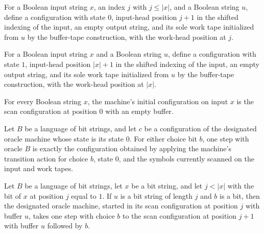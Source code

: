 \begin{definition}
\label{Complexity.uwScanCfg}
\leanok
{}
For a Boolean input string $x$, an index $j$ with $j\le |x|$, and a Boolean string $u$,
define a configuration with state $0$, input-head position $j+1$ in the shifted indexing
of the input, an empty output string, and its sole work tape initialized from $u$ by the
buffer-tape construction, with the work-head position at $j$.
\end{definition}

\begin{definition}
\label{Complexity.uwQueryCfg}
\leanok
{}
For a Boolean input string $x$ and a Boolean string $u$, define a configuration with
state $1$, input-head position $|x|+1$ in the shifted indexing of the input, an empty
output string, and its sole work tape initialized from $u$ by the buffer-tape
construction, with the work-head position at $|x|$.
\end{definition}

\begin{theorem}
\label{Complexity.uw_init}
\leanok
{}
For every Boolean string $x$, the machine's initial configuration on input $x$ is the
scan configuration at position $0$ with an empty buffer.
\end{theorem}

\begin{theorem}
\label{Complexity.uw_step_scan}
\leanok
{}
Let $B$ be a language of bit strings, and let $c$ be a configuration of the designated
oracle machine whose state is its state $0$. For either choice bit $b$, one step with
oracle $B$ is exactly the configuration obtained by applying the machine's transition
action for choice $b$, state $0$, and the symbols currently scanned on the input and
work tapes.
\end{theorem}

\begin{theorem}
\label{Complexity.uw_scan_step}
\leanok
{}
Let $B$ be a language of bit strings, let $x$ be a bit string, and let $j<|x|$ with the
bit of $x$ at position $j$ equal to $1$. If $u$ is a bit string of length $j$ and $b$ is
a bit, then the designated oracle machine, started in its scan configuration at position
$j$ with buffer $u$, takes one step with choice $b$ to the scan configuration at
position $j+1$ with buffer $u$ followed by $b$.
\end{theorem}


